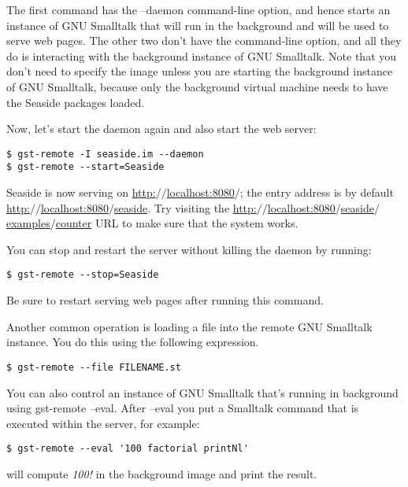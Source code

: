 \documentclass[a4paper,10pt,twoside]{book}
\newcommand{\ct}[1]{{\small\ttfamily\textup{#1}}}
\begin{document}
The first command has the \ct{--daemon} command-line option, and hence starts an instance of GNU Smalltalk that will run in the background and will be used to serve web pages. The other two don't have the command-line option, and all they do is interacting with the background instance of GNU Smalltalk. Note that you don't need to specify the image unless you are starting the background instance of GNU Smalltalk, because only the background virtual machine needs to have the Seaside packages loaded.

Now, let's start the daemon again and also start the web server:

\begin{lstlisting}
$ gst-remote -I seaside.im --daemon
$ gst-remote --start=Seaside
\end{lstlisting}

Seaside is now serving on \href{http://localhost:8080/}{http:$/$$/$localhost:8080$/$}; the entry address is by default \href{http://localhost:8080/seaside}{http:$/$$/$localhost:8080$/$seaside}. Try visiting the \href{http://localhost:8080/seaside/examples/counter}{http:$/$$/$localhost:8080$/$seaside$/$examples$/$counter} URL to make sure that the system works.

You can stop and restart the server without killing the daemon by running:

\begin{lstlisting}
$ gst-remote --stop=Seaside
\end{lstlisting}

Be sure to restart serving web pages after running this command.

Another common operation is loading a file into the remote GNU Smalltalk instance. You do this using the following expression.

\begin{lstlisting}
$ gst-remote --file FILENAME.st
\end{lstlisting}

You can also control an instance of GNU Smalltalk that's running in background using \ct{gst-remote --eval}. After \ct{--eval} you put a Smalltalk command that is executed within the server, for example:

\begin{lstlisting}
$ gst-remote --eval '100 factorial printNl'
\end{lstlisting}

will compute \textit{100!} in the background image and print the result.
\end{document}
